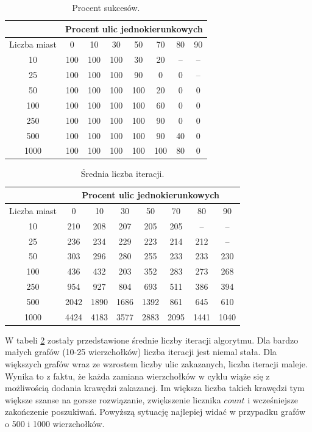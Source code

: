 \documentclass[11pt,a4paper,twoside]{article}
\begin{document}
\bgroup
\def\arraystretch{1.2}
\begin{table}[ht]
\centering
\begin{tabular}{|c|c|c|c|c|c|c|c|}
\hline
 & \multicolumn{7}{c|}{Procent ulic jednokierunkowych}\\\hline
Liczba miast & 0 & 10 & 30 & 50 & 70& 80& 90\\  \hline
10& 100& 100& 100& 30& 20& --& --\\ \hline
25& 100& 100& 100& 90& 0& 0& --\\ \hline
50& 100& 100& 100& 100& 20& 0& 0\\ \hline
100& 100& 100& 100& 100& 60& 0& 0\\ \hline
250& 100& 100& 100& 100& 90& 0& 0\\ \hline
500& 100& 100& 100& 100& 90& 40& 0\\ \hline
1000& 100& 100& 100& 100& 100& 80& 0\\ \hline
\end{tabular}
\caption{Procent sukcesów.}
\label{sukcesy}
\end{table}
\egroup

\bgroup
\def\arraystretch{1.2}
\begin{table}[ht]
\centering
\begin{tabular}{|c|c|c|c|c|c|c|c|}
\hline
 & \multicolumn{7}{c|}{Procent ulic jednokierunkowych}\\\hline
Liczba miast & 0 & 10 & 30 & 50 & 70& 80& 90\\  \hline
10& 210& 208& 207& 205& 205& --& --\\ \hline
25& 236& 234& 229& 223& 214& 212& --\\ \hline
50& 303& 296& 280& 255& 233& 233& 230\\ \hline
100& 436& 432& 203& 352& 283& 273& 268\\ \hline
250& 954& 927& 804& 693& 511& 386& 394\\ \hline
500& 2042& 1890& 1686& 1392& 861& 645& 610\\ \hline
1000& 4424& 4183& 3577& 2883& 2095& 1441& 1040\\ \hline
\end{tabular}
\caption{Średnia liczba iteracji.}
\label{liczbaIteracji}
\end{table}
\egroup

W tabeli \ref{liczbaIteracji} zostały przedstawione średnie liczby iteracji algorytmu. Dla bardzo małych grafów (10-25 wierzchołków) liczba iteracji jest niemal stała. Dla większych grafów wraz ze wzrostem liczby ulic zakazanych, liczba iteracji maleje. Wynika to z faktu, że każda zamiana wierzchołków w cyklu wiąże się z możliwością dodania krawędzi zakazanej. Im większa liczba takich krawędzi tym większe szanse na gorsze rozwiązanie, zwiększenie licznika $count$ i wcześniejsze zakończenie poszukiwań. Powyższą sytuację najlepiej widać w przypadku grafów o 500 i 1000 wierzchołków.
\end{document}
